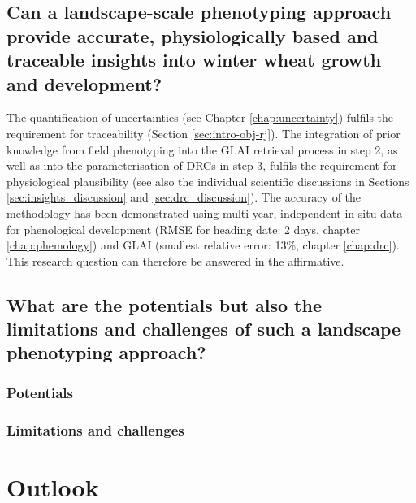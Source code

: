 \subsection{Can a landscape-scale phenotyping approach provide accurate, physiologically based and traceable insights into winter wheat growth and development?}
The quantification of uncertainties (see Chapter \ref{chap:uncertainty}) fulfils the requirement for traceability (Section \ref{sec:intro-obj-rj}). The integration of prior knowledge from field phenotyping into the \gls{GLAI} retrieval process in step 2, as well as into the parameterisation of \gls{DRC}s in step 3, fulfils the requirement for physiological plausibility (see also the individual scientific discussions in Sections \ref{sec:insights_discussion} and \ref{sec:drc_discussion}). The accuracy of the methodology has been demonstrated using multi-year, independent in-situ data for phenological development (RMSE for heading date: 2 days, chapter \ref{chap:phemology}) and GLAI (smallest relative error: 13\%, chapter \ref{chap:drc}). This research question can therefore be answered in the affirmative.

\subsection{What are the potentials but also the limitations and challenges of such a landscape phenotyping approach?}

\subsubsection{Potentials}

\subsubsection{Limitations and challenges}

\section{Outlook}
